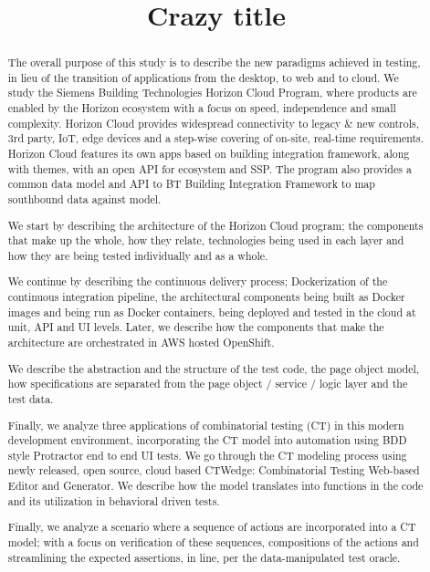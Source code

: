 \documentclass[conference]{IEEEtran}
\begin{document}
\title{Crazy title}


\author{
}

\maketitle


\begin{abstract}
The overall purpose of this study is to describe the new paradigms achieved in testing,
in lieu of the transition of applications from the desktop, to web and to cloud. 
We study the Siemens Building Technologies Horizon Cloud Program,
where products are enabled by the Horizon ecosystem with a focus on speed, independence and small complexity.
Horizon Cloud provides widespread connectivity to legacy \& new controls, 3rd party, IoT, 
edge devices and a step-wise covering of on-site, real-time requirements. 
Horizon Cloud features its own apps based on building integration framework, along with themes, with an open API for ecosystem and SSP. 
The program also provides a common data model and API to BT Building Integration Framework to map southbound data against model.

We start by describing the architecture of the Horizon Cloud program; the components that make up the whole, how they relate, 
technologies being used in each layer and how they are being tested individually and as a whole. 	

We continue by describing the continuous delivery process; Dockerization of the continuous integration pipeline,
the architectural components being built as Docker images and being run as Docker containers, being deployed and tested in the cloud at unit, API and UI levels. 
Later, we describe how the components that make the architecture are orchestrated in AWS hosted OpenShift. 

We describe the abstraction and the structure of the test code, the page object model, 
how specifications are separated from the page object / service / logic layer and the test data. 

Finally, we analyze three applications of combinatorial testing (CT) in this modern development environment,
incorporating the CT model into automation using BDD style Protractor end to end UI tests. 
We go through the CT modeling process using newly released, open source, cloud based CTWedge: Combinatorial Testing Web-based Editor and Generator. 
We describe how the model translates into functions in the code and its utilization in behavioral driven tests.

Finally, we analyze a scenario where a sequence of actions are incorporated into a CT model;
with a focus on verification of these sequences, compositions of the actions and streamlining the expected assertions,
in line, per the data-manipulated test oracle.

\end{abstract}
\end{document}
